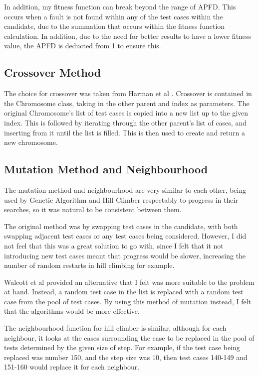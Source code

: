 \documentclass[11pt, a4paper]{article}
\begin{document}
In addition, my fitness function can break beyond the range of APFD. This occurs
when a fault is not found within any of the test cases within the candidate, due
to the summation that occurs within the fitness function calculation. In
addition, due to the need for better results to have a lower fitness value, the
APFD is deducted from 1 to ensure this.

\subsection{Crossover Method}
The choice for crossover was taken from Harman et al
\cite[Section~5.1]{Harman:2012:SSE:2379776.2379787}. Crossover is contained in
the Chromosome class, taking in the other parent and index as parameters. The
original Chromosome's list of test cases is copied into a new list up to the
given index. This is followed by iterating through the other parent's list of
cases, and inserting from it until the list is filled. This is then used to
create and return a new chromosome.

\subsection{Mutation Method and Neighbourhood}
The mutation method and neighbourhood are very similar to each other, being used
by Genetic Algorithm and Hill Climber respectably to progress in their searches,
so it was natural to be consistent between them.

The original method was by swapping test cases in the candidate, with both
swapping adjacent test cases or any test cases being considered. However, I did
not feel that this was a great solution to go with, since I felt that it not
introducing new test cases meant that progress would be slower, increasing the
number of random restarts in hill climbing for example.

Walcott et al \cite[Figure~4a]{Walcott:2006:TTS:1146238.1146240} provided an
alternative that I felt was more suitable to the problem at hand. Instead, a
random test case in the list is replaced with a random test case from the pool
of test cases. By using this method of mutation instead, I felt that the
algorithms would be more effective.

The neighbourhood function for hill climber is similar, although for each
neighbour, it looks at the cases surrounding the case to be replaced in the
pool of tests determined by the given size of step. For example, if the test
case being replaced was number 150, and the step size was 10, then test cases
140-149 and 151-160 would replace it for each neighbour.
\end{document}
